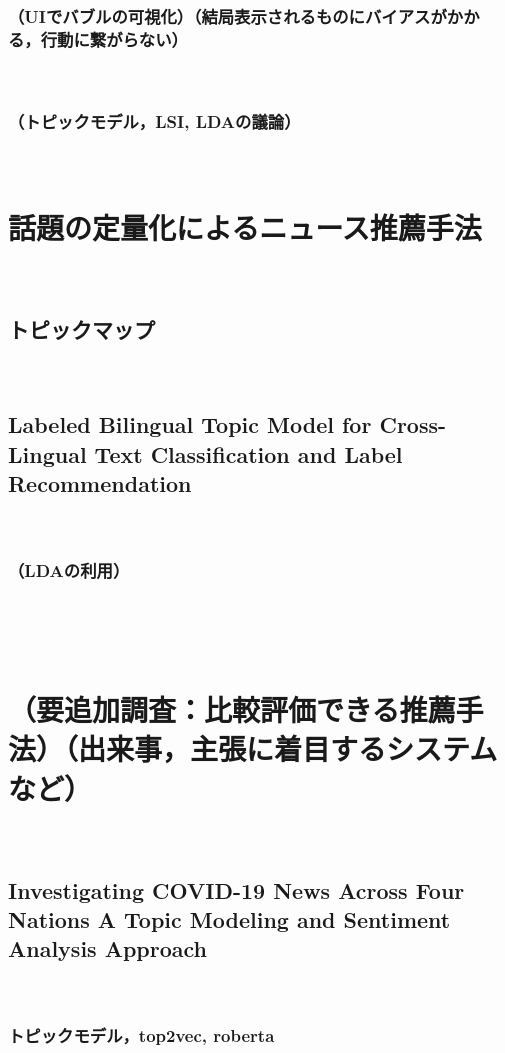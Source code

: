 \documentclass[12pt,a4j]{jreport}
\begin{document}
\subsubsection{（UIでバブルの可視化）（結局表示されるものにバイアスがかかる，行動に繋がらない）}
~

\subsubsection{（トピックモデル，LSI, LDAの議論）}
~

\section{話題の定量化によるニュース推薦手法}
~

\subsection{トピックマップ}
~

\subsection{Labeled Bilingual Topic Model for Cross-Lingual Text Classification and Label Recommendation}
~

\subsubsection{（LDAの利用）}
~

~

\section{（要追加調査：比較評価できる推薦手法）（出来事，主張に着目するシステムなど）}
~

\subsection{Investigating COVID-19 News Across Four Nations A Topic Modeling and Sentiment Analysis Approach}
~

\subsubsection{トピックモデル，top2vec, roberta}
~
\end{document}
